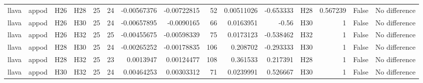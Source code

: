 \begin{longtable}{llllrrrrrrrlrrl}
llava & appod & H26 & H28 & 25 & 24 & -0.00567376 & -0.00722815 & 52 & 0.00511026 & -0.653333 & H28 & 0.567239 & False & No difference \\
llava & appod & H26 & H30 & 25 & 24 & -0.00657895 & -0.0090165 & 66 & 0.0163951 & -0.56 & H30 & 1 & False & No difference \\
llava & appod & H26 & H32 & 25 & 25 & -0.00455675 & -0.00598339 & 75 & 0.0173123 & -0.538462 & H32 & 1 & False & No difference \\
llava & appod & H28 & H30 & 25 & 24 & -0.00265252 & -0.00178835 & 106 & 0.208702 & -0.293333 & H30 & 1 & False & No difference \\
llava & appod & H28 & H32 & 25 & 23 & 0.0013947 & 0.00124477 & 108 & 0.361533 & 0.217391 & H28 & 1 & False & No difference \\
llava & appod & H30 & H32 & 25 & 24 & 0.00464253 & 0.00303312 & 71 & 0.0239991 & 0.526667 & H30 & 1 & False & No difference \\
\end{longtable}
